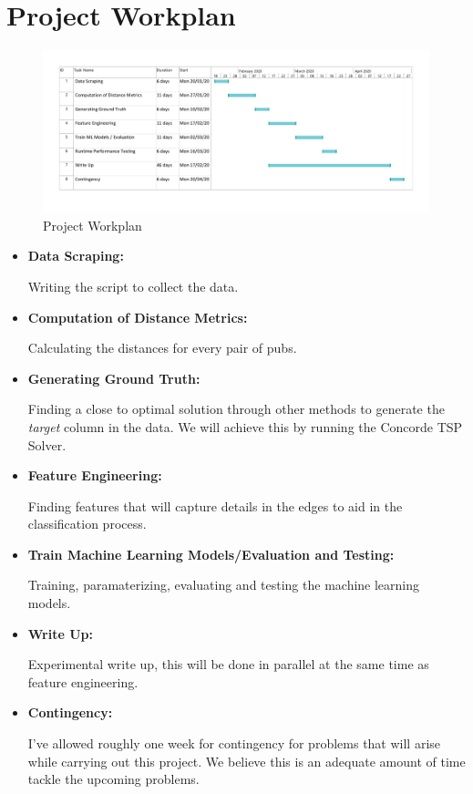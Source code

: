 \documentclass[]{UCD_CS_FYP_Report}
\begin{document}
\chapter{Project Workplan}
\begin{figure}[h]
    \centering
  \includegraphics[width=1\linewidth]{Figures/GanttChart.pdf}
  \caption{Project Workplan}
  \label{fig:Workplan}
\end{figure}

\begin{itemize}
    \item \textbf{Data Scraping: }
    
    Writing the script to collect the data.
    \item \textbf{Computation of Distance Metrics: }
    
    Calculating the distances for every pair of pubs.
    \item \textbf{Generating Ground Truth: }
    
    Finding a close to optimal solution through other methods to generate the \textit{target} column in the data. We will achieve this by running the Concorde TSP Solver.
    \item \textbf{Feature Engineering: }
    
    Finding features that will capture details in the edges to aid in the classification process.
    \item \textbf{Train Machine Learning Models/Evaluation and Testing: }
    
    Training, paramaterizing, evaluating and testing the machine learning models.
    \item \textbf{Write Up: }
    
    Experimental write up, this will be done in parallel at the same time as feature engineering.
    \item \textbf{Contingency: }
    
    I've allowed roughly one week for contingency for problems that will arise while carrying out this project. We believe this is an adequate amount of time tackle the upcoming problems.
\end{itemize}
\end{document}
